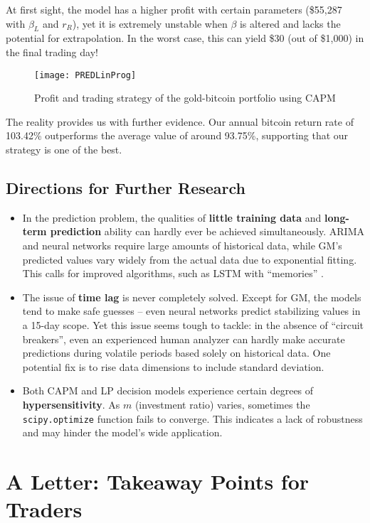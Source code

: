 \documentclass{mcmthesis}
\begin{document}
	At first sight, the model has a higher profit with certain parameters (\$55,287 with $\beta_L$ and $r_R$), yet it is extremely unstable when $\beta$ is altered and lacks the potential for extrapolation. In the worst case, this can yield \$30 (out of \$1,000) in the final trading day! 
	
	\begin{figure}[h]
		\centering \texttt{[image: PREDLinProg]}
		\caption{Profit and trading strategy of the gold-bitcoin portfolio using CAPM}
	\end{figure}
	
	The reality provides us with further evidence. Our annual bitcoin return rate of 103.42\% outperforms the average value of around 93.75\%, supporting that our strategy is one of the best. 
	
	\subsection{Directions for Further Research}
	
	\begin{itemize}
		\item In the prediction problem, the qualities of \textbf{little training data} and \textbf{long-term prediction} ability can hardly ever be achieved simultaneously. ARIMA and neural networks require large amounts of historical data, while GM's predicted values vary widely from the actual data due to exponential fitting. This calls for improved algorithms, such as LSTM with ``memories'' \cite{LSTM2}. 
		\item The issue of \textbf{time lag} is never completely solved. Except for GM, the models tend to make safe guesses -- even neural networks predict stabilizing values in a 15-day scope. Yet this issue seems tough to tackle: in the absence of ``circuit breakers'', even an experienced human analyzer can hardly make accurate predictions during volatile periods based solely on historical data. One potential fix is to rise data dimensions to include standard deviation. 
		\item Both CAPM and LP decision models experience certain degrees of \textbf{hypersensitivity}. As $m$ (investment ratio) varies, sometimes the \verb|scipy.optimize| function fails to converge. This indicates a lack of robustness and may hinder the model's wide application. 
	\end{itemize}
	
	\newpage
	\section{A Letter: Takeaway Points for Traders}
	
\end{document}
